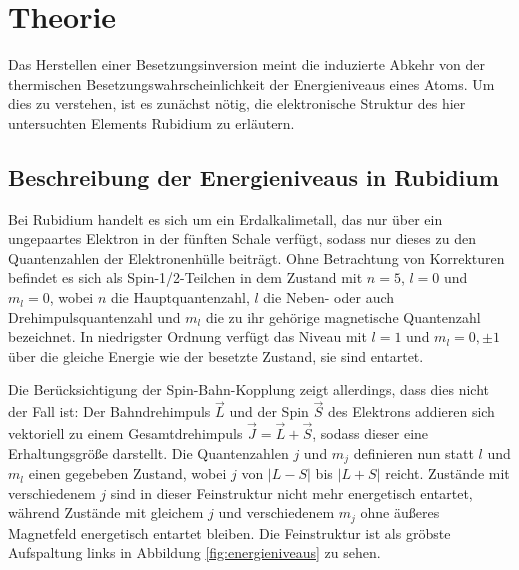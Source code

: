 \section{Theorie}
\label{sec:Theorie}
  Das Herstellen einer Besetzungsinversion meint die induzierte Abkehr von der thermischen Besetzungswahrscheinlichkeit der Energieniveaus eines Atoms.
  Um dies zu verstehen, ist es zunächst nötig, die elektronische Struktur des hier untersuchten Elements Rubidium zu erläutern.

  \subsection{Beschreibung der Energieniveaus in Rubidium}
  \label{subsec:energieniveaus}
  Bei Rubidium handelt es sich um ein Erdalkalimetall, das nur über ein ungepaartes Elektron in der fünften Schale verfügt, sodass nur dieses zu den Quantenzahlen der Elektronenhülle beiträgt.
  Ohne Betrachtung von Korrekturen befindet es sich als Spin-1/2-Teilchen in dem Zustand mit $n=5$, $l=0$ und $m_l=0$, wobei $n$ die Hauptquantenzahl, $l$ die Neben- oder auch Drehimpulsquantenzahl und $m_l$ die zu ihr gehörige magnetische Quantenzahl bezeichnet. In niedrigster Ordnung verfügt das Niveau mit $l=1$ und $m_l=0,\pm1$ über die gleiche Energie wie der besetzte Zustand, sie sind entartet.

  Die Berücksichtigung der Spin-Bahn-Kopplung zeigt allerdings, dass dies nicht der Fall ist: Der Bahndrehimpuls $\vec{L}$ und der Spin $\vec{S}$ des Elektrons addieren sich vektoriell zu einem Gesamtdrehimpuls $\vec{J}=\vec{L}+\vec{S}$, sodass dieser eine Erhaltungsgröße darstellt. Die Quantenzahlen $j$ und $m_j$ definieren nun statt $l$ und $m_l$ einen gegebeben Zustand, wobei $j$ von $\lvert L - S \rvert$ bis $\lvert L + S \rvert$ reicht. Zustände mit verschiedenem $j$ sind in dieser Feinstruktur nicht mehr energetisch entartet, während Zustände mit gleichem $j$ und verschiedenem $m_j$ ohne äußeres Magnetfeld energetisch entartet bleiben.
  Die Feinstruktur ist als gröbste Aufspaltung links in Abbildung \ref{fig:energieniveaus} zu sehen.

